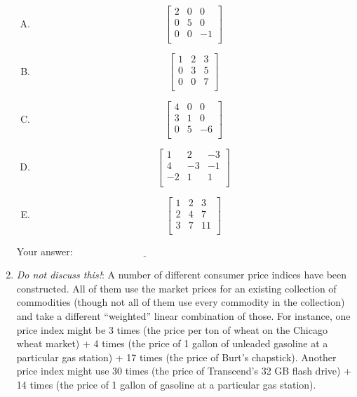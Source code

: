 \documentclass[10pt]{amsart}
\begin{document}
\begin{enumerate}
  \begin{enumerate}[(A)]
  \item $$\left[\begin{matrix} 2 & 0 & 0 \\ 0 & 5 & 0 \\ 0 & 0 & -1 \\\end{matrix}\right]$$
  \item $$\left[\begin{matrix} 1 & 2 & 3 \\ 0 & 3 & 5 \\ 0 & 0 & 7 \\\end{matrix} \right]$$
  \item $$\left[\begin{matrix} 4 & 0 & 0 \\ 3 & 1 & 0 \\ 0 & 5 & -6 \\\end{matrix}\right]$$
  \item $$\left[\begin{matrix} 1 & 2 & -3 \\ 4 & -3 & -1 \\ -2 & 1 & 1 \\\end{matrix}\right]$$
  \item $$\left[\begin{matrix} 1 & 2 & 3 \\ 2 & 4 & 7 \\ 3 & 7 & 11 \\\end{matrix}\right]$$
  \end{enumerate}

  \vspace{0.1in}
  Your answer: $\underline{\qquad\qquad\qquad\qquad\qquad\qquad\qquad}$
  \vspace{0.1in}

\item {\em Do not discuss this!}: A number of different consumer price
  indices have been constructed. All of them use the market prices for
  an existing collection of commodities (though not all of them use
  every commodity in the collection) and take a different ``weighted''
  linear combination of those. For instance, one price index might be
  3 times (the price per ton of wheat on the Chicago wheat market) + 4
  times (the price of 1 gallon of unleaded gasoline at a particular
  gas station) + 17 times (the price of Burt's chapstick). Another
  price index might use 30 times (the price of Transcend's 32 GB flash
  drive) + 14 times (the price of 1 gallon of gasoline at a particular
  gas station).


\end{enumerate}
\end{document}
